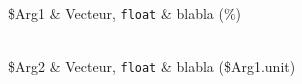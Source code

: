 \begin{tabarg}
\\
\hline
\$Arg1 & Vecteur, {\tt float} & blabla (\%)\\
\end{tabarg}

\medskip
\begin{tabarg}
\\
\hline
\$Arg2 & Vecteur, {\tt float} & blabla (\$Arg1.unit)\\
\end{tabarg}
